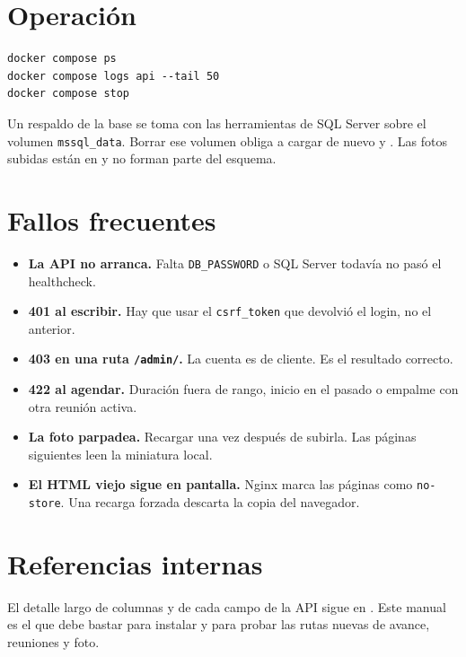 \section{Operación}

\begin{lstlisting}[caption={Parar y ver registros.}]
docker compose ps
docker compose logs api --tail 50
docker compose stop
\end{lstlisting}

Un respaldo de la base se toma con las herramientas de SQL Server sobre el
volumen \texttt{mssql\_data}. Borrar ese volumen obliga a cargar de nuevo
 y . Las fotos subidas están en
 y no forman parte del esquema.

\section{Fallos frecuentes}

\begin{itemize}
  \item \textbf{La API no arranca.} Falta \texttt{DB\_PASSWORD} o SQL Server todavía no pasó el healthcheck.
  \item \textbf{401 al escribir.} Hay que usar el \texttt{csrf\_token} que devolvió el login, no el anterior.
  \item \textbf{403 en una ruta \texttt{/admin/}.} La cuenta es de cliente. Es el resultado correcto.
  \item \textbf{422 al agendar.} Duración fuera de rango, inicio en el pasado o empalme con otra reunión activa.
  \item \textbf{La foto parpadea.} Recargar una vez después de subirla. Las páginas siguientes leen la miniatura local.
  \item \textbf{El HTML viejo sigue en pantalla.} Nginx marca las páginas como \texttt{no-store}. Una recarga forzada descarta la copia del navegador.
\end{itemize}

\section{Referencias internas}

El detalle largo de columnas y de cada campo de la API sigue en
. Este manual es el que debe bastar para instalar y para
probar las rutas nuevas de avance, reuniones y foto.


